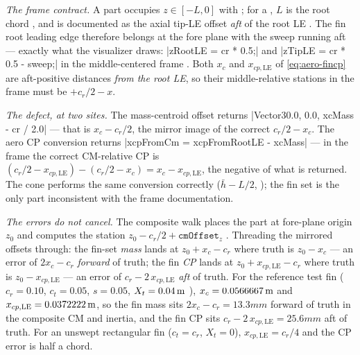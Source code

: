 \begin{hardfail}
\emph{The frame contract.} A part occupies $z \in [-L, 0]$ with \zfwd{}
; for a , $L$ is the root chord
, and  is documented as the axial tip-LE offset
\emph{aft} of the root LE . The fin root leading edge
therefore belongs at the fore plane with the sweep running aft --- exactly what the
visualizer draws: \cppinline|zRootLE = cr * 0.5;| and \cppinline|zTipLE = cr * 0.5 - sweep;|
in the middle-centered frame . Both $x_c$ and
$x_{cp,\mathrm{LE}}$ of \cref{eq:aero-fincp} are aft-positive distances \emph{from the root
LE}, so their middle-relative stations in the \zfwd{} frame must be $+c_r/2 - x$.

\emph{The defect, at two sites.} The mass-centroid offset returns
\cppinline|Vector3{0.0, 0.0, xcMass - cr / 2.0}|  --- that
is $x_c - c_r/2$, the mirror image of the correct $c_r/2 - x_c$. The aero CP conversion
returns \cppinline|xcpFromCm = xcpFromRootLE - xcMass|  ---
in the \zfwd{} frame the correct CM-relative CP is
$(c_r/2 - x_{cp,\mathrm{LE}}) - (c_r/2 - x_c) = x_c - x_{cp,\mathrm{LE}}$, the negative of
what is returned. The cone performs the same conversion correctly ($\bar{h} - L/2$,
); the fin set is the only part inconsistent with
the frame documentation.

\emph{The errors do not cancel.} The composite walk places the part at fore-plane origin
$z_0$ and computes the station $z_0 - c_r/2 + \mathtt{cmOffset}_z$
. Threading the mirrored offsets through: the fin-set
\emph{mass} lands at $z_0 + x_c - c_r$ where truth is $z_0 - x_c$ --- an error of
$2x_c - c_r$ \emph{forward} of truth; the fin \emph{CP} lands at
$z_0 + x_{cp,\mathrm{LE}} - c_r$ where truth is $z_0 - x_{cp,\mathrm{LE}}$ --- an error of
$c_r - 2\,x_{cp,\mathrm{LE}}$ \emph{aft} of truth. For the reference test fin
($c_r = 0.10$, $c_t = 0.05$, $s = 0.05$, $X_t = 0.04\,\mathrm{m}$
), $x_c = 0.0566667\,\mathrm{m}$ and
$x_{cp,\mathrm{LE}} = 0.0372222\,\mathrm{m}$, so the fin mass sits $2x_c - c_r = 13.3\unit{mm}$
forward of truth in the composite CM and inertia, and the fin CP sits
$c_r - 2\,x_{cp,\mathrm{LE}} = 25.6\unit{mm}$ aft of truth. For an unswept rectangular fin
($c_t = c_r$, $X_t = 0$), $x_{cp,\mathrm{LE}} = c_r/4$ and the CP error is half a chord.


\end{hardfail}
